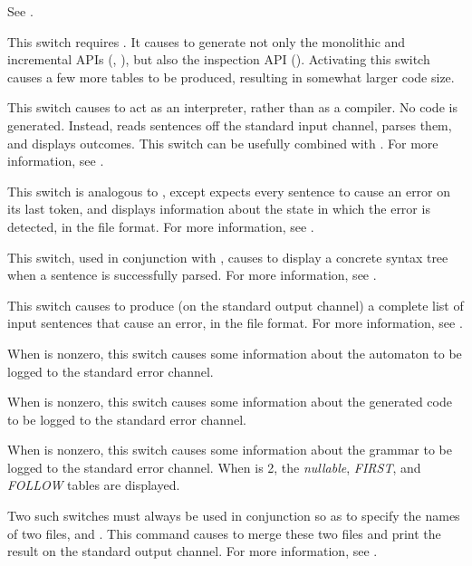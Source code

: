 \documentclass[onecolumn,11pt,nocopyrightspace,preprint]{sigplanconf}
\begin{document}
\docswitch{\oinfer, \oinferwrite, \oinferread} See .

\docswitch{\oinspection} This switch requires \otable. It causes \menhir to generate
not only the monolithic and incremental APIs (,
), but also the inspection API ().
Activating this switch causes a few more tables to be produced, resulting in
somewhat larger code size.

\docswitch{\ointerpret} This switch causes \menhir to act as an interpreter,
rather than as a compiler. No \ocaml code is generated. Instead, \menhir
reads sentences off the standard input channel, parses them, and displays
outcomes. This switch can be usefully combined with \otrace.
For more information, see .

\docswitch{\ointerpreterror} This switch is analogous to \ointerpret, except
\menhir expects every sentence to cause an error on its last token, and
displays information about the state in which the error is detected, in
the \messages file format. For more information, see .

\docswitch{\ointerpretshowcst} This switch, used in conjunction with \ointerpret,
causes \menhir to display a concrete syntax tree when a sentence is successfully
parsed. For more information, see .

\docswitch{\olisterrors} This switch causes \menhir to produce (on the standard
output channel) a complete list of input sentences that cause an error, in the
\messages file format. For more information, see .

 When  is nonzero, this switch
causes some information about the automaton to be logged to the standard error
channel.

 When  is nonzero, this switch
causes some information about the generated \ocaml code to be logged to the
standard error channel.

 When  is nonzero, this switch
causes some information about the grammar to be logged to the standard error
channel. When  is 2, the \emph{nullable}, \emph{FIRST}, and
\emph{FOLLOW} tables are displayed.

 Two such
switches must always be used in conjunction so as to specify the names of two
\messages files,  and . This command causes
\menhir to merge these two \messages files and print the result on the
standard output channel. For more information, see .
\end{document}

